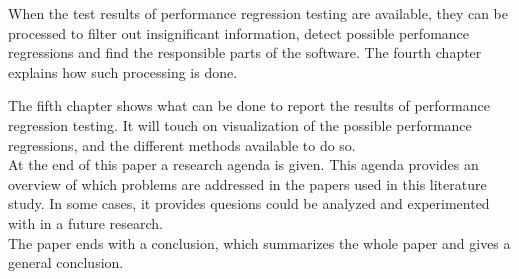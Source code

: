 When the test results of performance regression testing are available, they can be processed to filter out insignificant information, detect possible perfomance regressions and find the responsible parts of the software. The fourth chapter explains how such processing is done.

The fifth chapter shows what can be done to report the results of performance regression testing. It will touch on visualization of the possible performance regressions, and the different methods available to do so. \\

At the end of this paper a research agenda is given. This agenda provides an overview of which problems are addressed in the papers used in this literature study. In some cases, it provides quesions could be analyzed and experimented with in a future research. \\
The paper ends with a conclusion, which summarizes the whole paper and gives a general conclusion.
